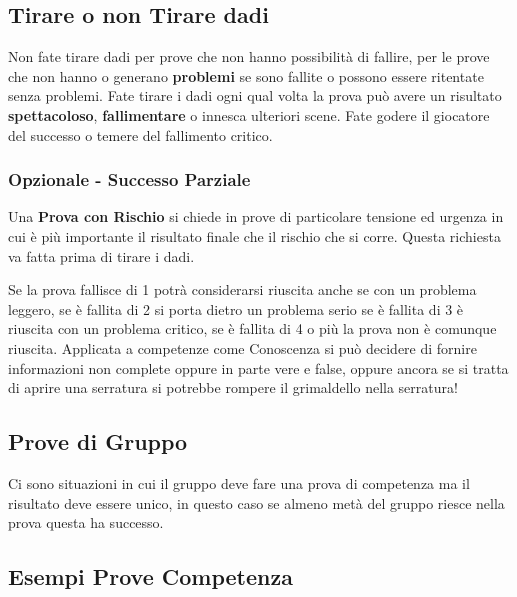 \begin{multicols}{2}
\subsection{Tirare o non Tirare dadi}\label{tirarenontiraredadi}

Non fate tirare dadi per prove che non hanno possibilità di fallire, per le prove che non hanno o generano \textbf{problemi} se sono fallite o possono essere ritentate senza problemi. Fate tirare i dadi ogni qual volta la prova può avere un risultato \textbf{spettacoloso}, \textbf{fallimentare} o innesca ulteriori scene. Fate godere il giocatore del successo o temere del fallimento critico.

\subsubsection{Opzionale - Successo Parziale}\hypertarget{successoparziale}{}\label{successoparziale}

Una \textbf{Prova con Rischio} si chiede in prove di particolare tensione ed urgenza in cui è più importante il risultato finale che il rischio che si corre. Questa richiesta va fatta prima di tirare i dadi.

Se la prova fallisce di 1 potrà considerarsi riuscita anche se con un problema leggero, se è fallita di 2 si porta dietro un problema serio se è fallita di 3 è riuscita con un problema critico, se è fallita di 4 o più la prova non è comunque riuscita. Applicata a competenze come Conoscenza si può decidere di fornire informazioni non complete oppure in parte vere e false, oppure ancora se si tratta di aprire una serratura si potrebbe rompere il grimaldello nella serratura!

\subsection{Prove di Gruppo}\label{provedigruppo}\hypertarget{provedigruppo}{}

Ci sono situazioni in cui il gruppo deve fare una prova di competenza ma il risultato deve essere unico, in questo caso se almeno metà del gruppo riesce nella prova questa ha successo.

\subsection{Esempi Prove Competenza}\label{esempiprovecompetenza}\hypertarget{esempiprovecompetenze}{}


\end{multicols}
